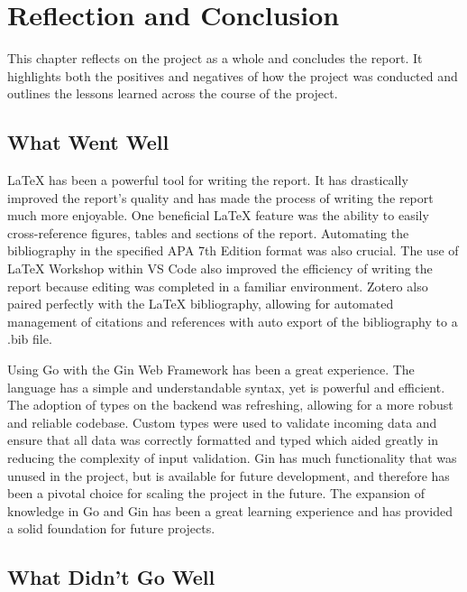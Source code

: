 \chapter{Reflection and Conclusion}
\label{chap:reflection-and-conclusion}

This chapter reflects on the project as a whole and concludes the report. It highlights both the positives  and negatives  of how the project was conducted and outlines the lessons learned across the course of the project.

\label{reflection-and-conclusion:what-went-well}
\section{What Went Well}

LaTeX has been a powerful tool for writing the report. It has drastically improved the report's quality and has made the process of writing the report much more enjoyable. One beneficial LaTeX feature was the ability to easily cross-reference figures, tables and sections of the report. Automating the bibliography in the specified APA 7th Edition format was also crucial. The use of LaTeX Workshop within VS Code also improved the efficiency of writing the report because editing was completed in a familiar environment. Zotero also paired perfectly with the LaTeX bibliography, allowing for automated management of citations and references with auto export of the bibliography to a .bib file.

Using Go with the Gin Web Framework has been a great experience. The language has a simple and understandable syntax, yet is powerful and efficient. The adoption of types on the backend was refreshing, allowing for a more robust and reliable codebase. Custom types were used to validate incoming data and ensure that all data was correctly formatted and typed which aided greatly in reducing the complexity of input validation. Gin has much functionality that was unused in the project, but is available for future development, and therefore has been a pivotal choice for scaling the project in the future. The expansion of knowledge in Go and Gin has been a great learning experience and has provided a solid foundation for future projects.

\label{reflection-and-conclusion:what-didnt-go-well}
\section{What Didn't Go Well}

